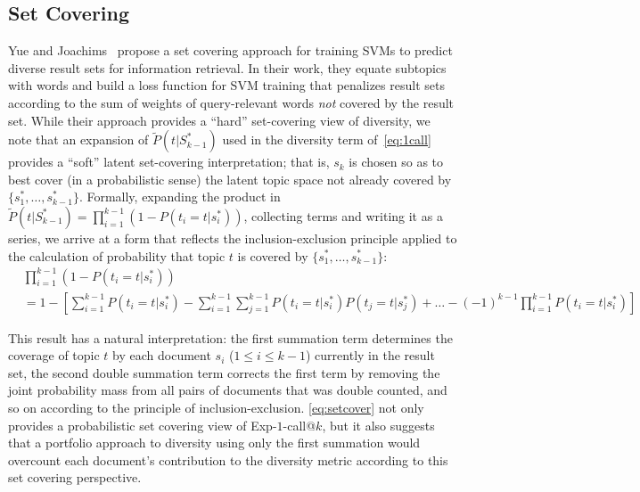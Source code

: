 \subsection{Set Covering}
Yue and Joachims~\cite{yue081224Predicting} propose a set covering
approach for training SVMs to predict diverse result sets for
information retrieval.  In their work, they equate subtopics with
words and build a loss function for SVM training that penalizes result
sets according to the sum of weights of query-relevant words
\emph{not} covered by the result set.  While their approach provides a
``hard'' set-covering view of diversity, we note that an expansion of
$\tilde{P}(t | S_{k-1}^*)$ used in the diversity term
of~\eqref{eq:1call} provides a ``soft'' latent set-covering
interpretation; that is, $s_k$ is chosen so as to best cover (in a
probabilistic sense) the latent topic space not already covered by $\{
s_1^*,\ldots,s_{k-1}^* \}$.  Formally, expanding the product in
$\tilde{P}(t | S_{k-1}^*) = \prod_{i=1}^{k-1} \left(1 -
P(t_{i}=t|s_{i}^{*})\right)$, collecting terms and writing it as a
series, we arrive at a form that reflects the inclusion-exclusion
principle applied to the calculation of probability that topic $t$ is
covered by $\{ s_1^*,\ldots,s_{k-1}^* \}$:
\begin{align}
& \prod_{i=1}^{k-1} \left(1 - P(t_{i}=t|s_{i}^{*})\right) \nonumber \\
& = 1 - \left[ \sum_{i=1}^{k-1} P(t_{i}= t|s_{i}^{*}) - \sum_{i=1}^{k-1}\sum_{j=1}^{k-1}P(t_{i}= t|s_{i}^{*})P(t_{j}= t|s_{j}^{*}) + \dots - (-1)^{k-1}\prod_{i=1}^{k-1}P(t_{i}=t|s_{i}^{*})\right] \label{eq:setcover}
\end{align}

This result has a natural interpretation: the first summation term
determines the coverage of topic $t$ by each document $s_i$ ($1 \leq i
\leq k-1$) currently in the result set, the second double summation
term corrects the first term by removing the joint probability mass
from all pairs of documents that was double counted, and so on
according to the principle of inclusion-exclusion.
\eqref{eq:setcover} not only provides a probabilistic set covering
view of Exp-$1$-call@$k$, but it also suggests that a portfolio
approach to diversity using only the first summation would overcount
each document's contribution to the diversity metric according to this
set covering perspective.

